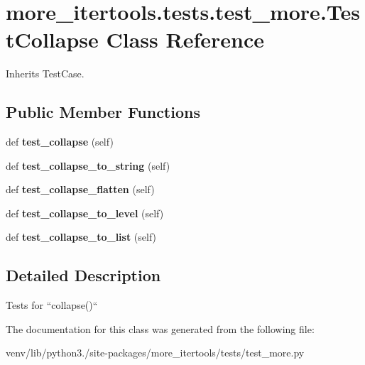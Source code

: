 \hypertarget{classmore__itertools_1_1tests_1_1test__more_1_1_test_collapse}{}\section{more\+\_\+itertools.\+tests.\+test\+\_\+more.\+Test\+Collapse Class Reference}
\label{classmore__itertools_1_1tests_1_1test__more_1_1_test_collapse}


Inherits Test\+Case.

\subsection*{Public Member Functions}
\begin{DoxyCompactItemize}
\item 
\mbox{\label{classmore__itertools_1_1tests_1_1test__more_1_1_test_collapse_a8200421e81cc846c2449d04b17732ed6}} 
def {\bfseries test\+\_\+collapse} (self)
\item 
\mbox{\label{classmore__itertools_1_1tests_1_1test__more_1_1_test_collapse_a62079c1abe2f9f0e04d9b151ed01acfa}} 
def {\bfseries test\+\_\+collapse\+\_\+to\+\_\+string} (self)
\item 
\mbox{\label{classmore__itertools_1_1tests_1_1test__more_1_1_test_collapse_a3793198ce0f9b3d2f5564babc242732f}} 
def {\bfseries test\+\_\+collapse\+\_\+flatten} (self)
\item 
\mbox{\label{classmore__itertools_1_1tests_1_1test__more_1_1_test_collapse_a2a022d64b7a6340de58ac5e3846baf69}} 
def {\bfseries test\+\_\+collapse\+\_\+to\+\_\+level} (self)
\item 
\mbox{\label{classmore__itertools_1_1tests_1_1test__more_1_1_test_collapse_a077b620051d5296bc31a34409ad01ebe}} 
def {\bfseries test\+\_\+collapse\+\_\+to\+\_\+list} (self)
\end{DoxyCompactItemize}


\subsection{Detailed Description}
\begin{DoxyVerb}Tests for ``collapse()``\end{DoxyVerb}
 

The documentation for this class was generated from the following file\+:\begin{DoxyCompactItemize}
\item 
venv/lib/python3./site-\/packages/more\+\_\+itertools/tests/test\+\_\+more.\+py\end{DoxyCompactItemize}
